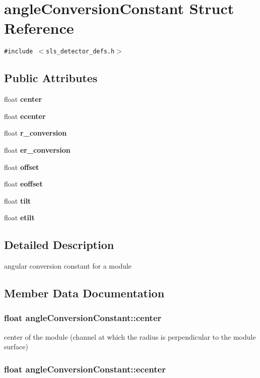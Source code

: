 \section{angle\-Conversion\-Constant Struct Reference}
\label{structangleConversionConstant}
{\tt \#include $<$sls\_\-detector\_\-defs.h$>$}

\subsection*{Public Attributes}
\begin{CompactItemize}
\item 
float \bf{center}
\item 
float \bf{ecenter}
\item 
float \bf{r\_\-conversion}
\item 
float \bf{er\_\-conversion}
\item 
float \bf{offset}
\item 
float \bf{eoffset}
\item 
float \bf{tilt}
\item 
float \bf{etilt}
\end{CompactItemize}


\subsection{Detailed Description}
angular conversion constant for a module 



\subsection{Member Data Documentation}
\subsubsection{\setlength{\rightskip}{0pt plus 5cm}float \bf{angle\-Conversion\-Constant::center}}\label{structangleConversionConstant_3e4a757b4b527bdc68872d62e071dffc}


center of the module (channel at which the radius is perpendicular to the module surface) 
\subsubsection{\setlength{\rightskip}{0pt plus 5cm}float \bf{angle\-Conversion\-Constant::ecenter}}\label{structangleConversionConstant_9927754f8e0f20a6315b423e265a7431}


